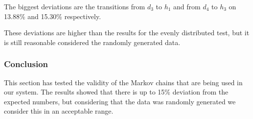 The biggest deviations are the transitions from $ d_3 $ to $ h_1 $ and from $ d_4 $ to $ h_3 $ on 13.88\% and 15.30\% respectively.

These deviations are higher than the results for the evenly distributed test, but it is still reasonable considered the randomly generated data.

\subsubsection{Conclusion}
This section has tested the validity of the Markov chains that are being used in our system.
The results showed that there is up to 15\% deviation from the expected numbers, but considering that the data was randomly generated we consider this in an acceptable range.
